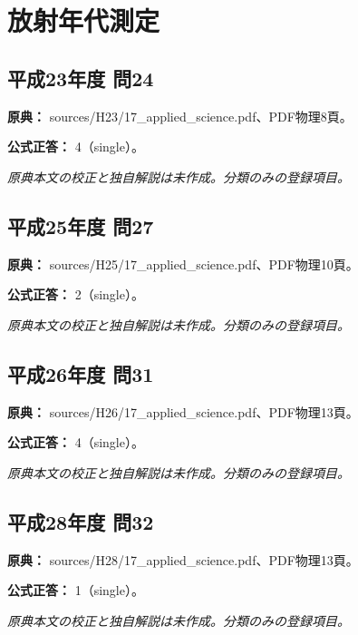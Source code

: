 \section{放射年代測定}

\subsection{平成23年度 問24}
\label{q:h23-reg-applied-24}

\noindent\textbf{原典：} sources/H23/17\_applied\_science.pdf、PDF物理8頁。

\textbf{公式正答：} 4（single）。

\par\textit{原典本文の校正と独自解説は未作成。分類のみの登録項目。}

\subsection{平成25年度 問27}
\label{q:h25-reg-applied-27}

\noindent\textbf{原典：} sources/H25/17\_applied\_science.pdf、PDF物理10頁。

\textbf{公式正答：} 2（single）。

\par\textit{原典本文の校正と独自解説は未作成。分類のみの登録項目。}

\subsection{平成26年度 問31}
\label{q:h26-reg-applied-31}

\noindent\textbf{原典：} sources/H26/17\_applied\_science.pdf、PDF物理13頁。

\textbf{公式正答：} 4（single）。

\par\textit{原典本文の校正と独自解説は未作成。分類のみの登録項目。}

\subsection{平成28年度 問32}
\label{q:h28-reg-applied-32}

\noindent\textbf{原典：} sources/H28/17\_applied\_science.pdf、PDF物理13頁。

\textbf{公式正答：} 1（single）。

\par\textit{原典本文の校正と独自解説は未作成。分類のみの登録項目。}

